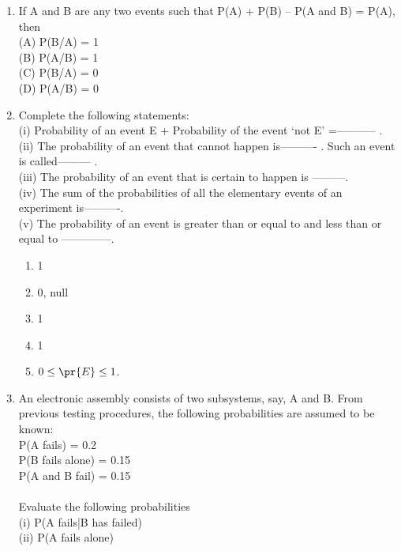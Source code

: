 \begin{enumerate}[label=\thesection.\arabic*.,ref=\thesection.\theenumi]
\item If A and B are any two events such that P(A) + P(B) – P(A and B) = P(A), then\\
(A) P(B/A) = 1 \\
(B) P(A/B) = 1\\
(C) P(B/A) = 0 \\
(D) P(A/B) = 0\\
\item Complete the following statements:\\
 (i) Probability of an event E + Probability of the event ‘not E’ =----------- .\\
 (ii) The probability of an event that cannot happen is---------- . Such an event is called--------- .\\
 (iii) The probability of an event that is certain to happen is ---------.\\
 (iv) The sum of the probabilities of all the elementary events of an experiment is----------.\\ 
 (v) The probability of an event is greater than or equal to and less than or equal to --------------.\\
 \solution
 \begin{enumerate}
 \item 1
 \item 0, null
 \item 1
 \item 1
 \item $0 \le \pr{E} \le 1$.
 \end{enumerate}
 \item An electronic assembly consists of two subsystems, say, A and B. From previous testing procedures, the following probabilities are assumed to be known:\\
P(A fails) = 0.2\\
P(B fails alone) = 0.15\\
P(A and B fail) = 0.15\\
\\Evaluate the following probabilities\\
(i) P(A fails|B has failed) \\
(ii) P(A fails alone)\\
\solution



\end{enumerate}
